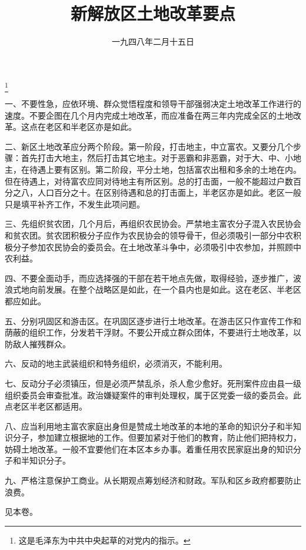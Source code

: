 
\title{新解放区土地改革要点}
\date{一九四八年二月十五日}
\thanks{这是毛泽东为中共中央起草的对党内的指示。}
\maketitle


一、不要性急，应依环境、群众觉悟程度和领导干部强弱决定土地改革工作进行的速度。不要企图在几个月内完成土地改革，而应准备在两三年内完成全区的土地改革。这点在老区和半老区亦是如此。

二、新区土地改革应分两个阶段。第一阶段，打击地主，中立富农。又要分几个步骤：首先打击大地主，然后打击其它地主。对于恶霸和非恶霸，对于大、中、小地主，在待遇上要有区别。第二阶段，平分土地，包括富农出租和多余的土地在内。但在待遇上，对待富农应同对待地主有所区别。总的打击面，一般不能超过户数百分之八，人口百分之十。在区别待遇和总的打击面上，半老区亦是如此。老区一般只是填平补齐工作，不发生此项问题。

三、先组织贫农团，几个月后，再组织农民协会。严禁地主富农分子混入农民协会和贫农团。贫农团积极分子应作为农民协会的领导骨干，但必须吸引一部分中农积极分子参加农民协会的委员会。在土地改革斗争中，必须吸引中农参加，并照顾中农利益。

四、不要全面动手，而应选择强的干部在若干地点先做，取得经验，逐步推广，波浪式地向前发展。在整个战略区是如此，在一个县内也是如此。这在老区、半老区都应如此。

五、分别巩固区和游击区。在巩固区逐步进行土地改革。在游击区只作宣传工作和荫蔽的组织工作，分发若干浮财。不要公开成立群众团体，不要进行土地改革，以防敌人摧残群众。

六、反动的地主武装组织和特务组织，必须消灭，不能利用。

七、反动分子必须镇压，但是必须严禁乱杀，杀人愈少愈好。死刑案件应由县一级组织委员会审查批准。政治嫌疑案件的审判处理权，属于区党委一级的委员会。此点老区半老区都适用。

八、应当利用地主富农家庭出身但是赞成土地改革的本地的革命的知识分子和半知识分子，参加建立根据地的工作。但要加紧对于他们的教育，防止他们把持权力，妨碍土地改革。一般不宜要他们在本区本乡办事。着重任用农民家庭出身的知识分子和半知识分子。

九、严格注意保护工商业。从长期观点筹划经济和财政。军队和区乡政府都要防止浪费。


\begin{maonote}
见本卷。
\end{maonote}

